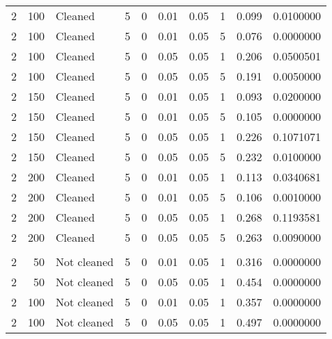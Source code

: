 \begin{table}
{{\begin{tabular}{rrlrrrrrrr}
\hspace{1em}2 & 100 & Cleaned & 5 & 0 & 0.01 & 0.05 & 1 & 0.099 & 0.0100000\\
\hspace{1em}2 & 100 & Cleaned & 5 & 0 & 0.01 & 0.05 & 5 & 0.076 & 0.0000000\\
\hspace{1em}2 & 100 & Cleaned & 5 & 0 & 0.05 & 0.05 & 1 & 0.206 & 0.0500501\\
\hspace{1em}2 & 100 & Cleaned & 5 & 0 & 0.05 & 0.05 & 5 & 0.191 & 0.0050000\\
\hspace{1em}2 & 150 & Cleaned & 5 & 0 & 0.01 & 0.05 & 1 & 0.093 & 0.0200000\\
\hspace{1em}2 & 150 & Cleaned & 5 & 0 & 0.01 & 0.05 & 5 & 0.105 & 0.0000000\\
\hspace{1em}2 & 150 & Cleaned & 5 & 0 & 0.05 & 0.05 & 1 & 0.226 & 0.1071071\\
\hspace{1em}2 & 150 & Cleaned & 5 & 0 & 0.05 & 0.05 & 5 & 0.232 & 0.0100000\\
\hspace{1em}2 & 200 & Cleaned & 5 & 0 & 0.01 & 0.05 & 1 & 0.113 & 0.0340681\\
\hspace{1em}2 & 200 & Cleaned & 5 & 0 & 0.01 & 0.05 & 5 & 0.106 & 0.0010000\\
\hspace{1em}2 & 200 & Cleaned & 5 & 0 & 0.05 & 0.05 & 1 & 0.268 & 0.1193581\\
\hspace{1em}2 & 200 & Cleaned & 5 & 0 & 0.05 & 0.05 & 5 & 0.263 & 0.0090000\\
\addlinespace[0.3em]
\multicolumn{10}{l}{\textbf{$t_3$ Distribution}}\\
\hspace{1em}2 & 50 & Not cleaned & 5 & 0 & 0.01 & 0.05 & 1 & 0.316 & 0.0000000\\
\hspace{1em}2 & 50 & Not cleaned & 5 & 0 & 0.05 & 0.05 & 1 & 0.454 & 0.0000000\\
\hspace{1em}2 & 100 & Not cleaned & 5 & 0 & 0.01 & 0.05 & 1 & 0.357 & 0.0000000\\
\hspace{1em}2 & 100 & Not cleaned & 5 & 0 & 0.05 & 0.05 & 1 & 0.497 & 0.0000000\\

\end{tabular}}}
\end{table}
